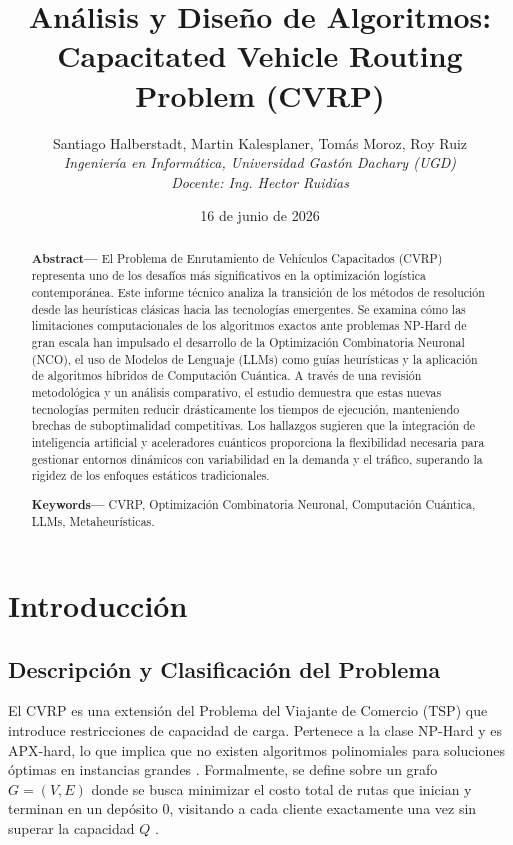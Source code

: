 \documentclass[a4paper, 11pt]{article}
\begin{document}
\title{\textbf{Análisis y Diseño de Algoritmos: Capacitated Vehicle Routing Problem (CVRP)}}

\author{
    Santiago Halberstadt, Martin Kalesplaner, Tomás Moroz, Roy Ruiz \\
    \textit{Ingeniería en Informática, Universidad Gastón Dachary (UGD)} \\
    \textit{Docente: Ing. Hector Ruidias}
}
\date{16 de junio de 2026}

\maketitle

\begin{abstract}
\textbf{Abstract—} El Problema de Enrutamiento de Vehículos Capacitados (CVRP) representa uno de los desafíos más significativos en la optimización logística contemporánea. Este informe técnico analiza la transición de los métodos de resolución desde las heurísticas clásicas hacia las tecnologías emergentes. Se examina cómo las limitaciones computacionales de los algoritmos exactos ante problemas NP-Hard de gran escala han impulsado el desarrollo de la Optimización Combinatoria Neuronal (NCO), el uso de Modelos de Lenguaje (LLMs) como guías heurísticas y la aplicación de algoritmos híbridos de Computación Cuántica. A través de una revisión metodológica y un análisis comparativo, el estudio demuestra que estas nuevas tecnologías permiten reducir drásticamente los tiempos de ejecución, manteniendo brechas de suboptimalidad competitivas. Los hallazgos sugieren que la integración de inteligencia artificial y aceleradores cuánticos proporciona la flexibilidad necesaria para gestionar entornos dinámicos con variabilidad en la demanda y el tráfico, superando la rigidez de los enfoques estáticos tradicionales.

\vspace{0.3cm}
\textbf{Keywords—} CVRP, Optimización Combinatoria Neuronal, Computación Cuántica, LLMs, Metaheurísticas.
\end{abstract}

\section{Introducción}

\subsection{Descripción y Clasificación del Problema}
El CVRP es una extensión del Problema del Viajante de Comercio (TSP) que introduce restricciones de capacidad de carga. Pertenece a la clase NP-Hard y es APX-hard, lo que implica que no existen algoritmos polinomiales para soluciones óptimas en instancias grandes \cite{ref1}. Formalmente, se define sobre un grafo $G=(V,E)$ donde se busca minimizar el costo total de rutas que inician y terminan en un depósito 0, visitando a cada cliente exactamente una vez sin superar la capacidad $Q$ \cite{ref1}.
\end{document}
